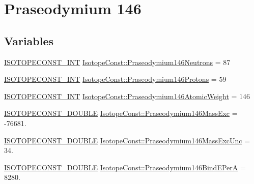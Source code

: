 \hypertarget{group___isotope_const-_praseodymium-_pr146}{}\section{Praseodymium 146}
\label{group___isotope_const-_praseodymium-_pr146}
\subsection*{Variables}
\begin{DoxyCompactItemize}
\item 
\mbox{\hyperlink{group___isotope_const-_macros_ga5f18360b3e99483a35c32d789e62621c}{I\+S\+O\+T\+O\+P\+E\+C\+O\+N\+S\+T\+\_\+\+I\+NT}} \mbox{\hyperlink{group___isotope_const-_praseodymium-_pr146_ga766b6e80d0c0e6a8abe722e2c2da4e98}{Isotope\+Const\+::\+Praseodymium146\+Neutrons}} = 87
\item 
\mbox{\hyperlink{group___isotope_const-_macros_ga5f18360b3e99483a35c32d789e62621c}{I\+S\+O\+T\+O\+P\+E\+C\+O\+N\+S\+T\+\_\+\+I\+NT}} \mbox{\hyperlink{group___isotope_const-_praseodymium-_pr146_ga41067354d75ed89f2262bab4f9fceeda}{Isotope\+Const\+::\+Praseodymium146\+Protons}} = 59
\item 
\mbox{\hyperlink{group___isotope_const-_macros_ga5f18360b3e99483a35c32d789e62621c}{I\+S\+O\+T\+O\+P\+E\+C\+O\+N\+S\+T\+\_\+\+I\+NT}} \mbox{\hyperlink{group___isotope_const-_praseodymium-_pr146_ga3a15cb6e745b3a61b421c6f4e1c25cd5}{Isotope\+Const\+::\+Praseodymium146\+Atomic\+Weight}} = 146
\item 
\mbox{\hyperlink{group___isotope_const-_macros_ga8f45a7272ce02c0b4c65c44636ed719a}{I\+S\+O\+T\+O\+P\+E\+C\+O\+N\+S\+T\+\_\+\+D\+O\+U\+B\+LE}} \mbox{\hyperlink{group___isotope_const-_praseodymium-_pr146_gaf9ec8fba1ec4003641889e9bdba61668}{Isotope\+Const\+::\+Praseodymium146\+Mass\+Exc}} = -\/76681.
\item 
\mbox{\hyperlink{group___isotope_const-_macros_ga8f45a7272ce02c0b4c65c44636ed719a}{I\+S\+O\+T\+O\+P\+E\+C\+O\+N\+S\+T\+\_\+\+D\+O\+U\+B\+LE}} \mbox{\hyperlink{group___isotope_const-_praseodymium-_pr146_gaca7859118d21956a2758bad13eecd4b9}{Isotope\+Const\+::\+Praseodymium146\+Mass\+Exc\+Unc}} = 34.
\item 
\mbox{\hyperlink{group___isotope_const-_macros_ga8f45a7272ce02c0b4c65c44636ed719a}{I\+S\+O\+T\+O\+P\+E\+C\+O\+N\+S\+T\+\_\+\+D\+O\+U\+B\+LE}} \mbox{\hyperlink{group___isotope_const-_praseodymium-_pr146_gaf4ea0c95fd40b931aed66a24974fb37c}{Isotope\+Const\+::\+Praseodymium146\+Bind\+E\+PerA}} = 8280.

\end{DoxyCompactItemize}
